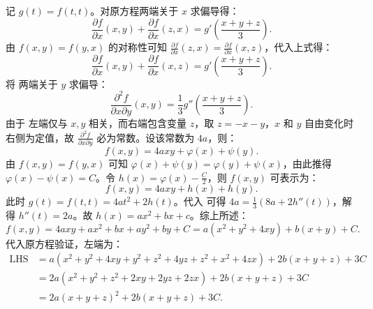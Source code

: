 \begin{solution}

    记 $g(t) = f(t,t)$。对原方程两端关于 $x$ 求偏导得：
    \begin{equation}
        \frac{\partial f}{\partial x}(x,y) + \frac{\partial f}{\partial x}(z,x) = g'\left( \frac{x+y+z}{3} \right).
    \end{equation}
    由 $f(x,y) = f(y,x)$ 的对称性可知 $\frac{\partial f}{\partial x}(z,x) = \frac{\partial f}{\partial x}(x,z)$，代入上式得：
    \begin{equation}
        \frac{\partial f}{\partial x}(x,y) + \frac{\partial f}{\partial x}(x,z) = g'\left( \frac{x+y+z}{3} \right). \label{eq:partial-x-1}
    \end{equation}
    将  两端关于 $y$ 求偏导：
    \begin{equation}
        \frac{\partial^2 f}{\partial x \partial y}(x,y) = \frac{1}{3} g''\left( \frac{x+y+z}{3} \right). \label{eq:second-partial-1}
    \end{equation}
    由于  左端仅与 $x,y$ 相关，而右端包含变量 $z$，取 $z = -x-y$，$x$ 和 $y$ 自由变化时右侧为定值，故 $\frac{\partial^2 f}{\partial x \partial y}$ 必为常数。设该常数为 $4a$，则：
    \begin{equation}
        f(x,y) = 4axy + \varphi(x) + \psi(y).
    \end{equation}
    由 $f(x,y) = f(y,x)$ 可知 $\varphi(x) + \psi(y) = \varphi(y) + \psi(x)$，由此推得 $\varphi(x) - \psi(x) = C$。令 $h(x) = \varphi(x) - \frac{C}{2}$，则 $f(x,y)$ 可表示为：
    \begin{equation}
        f(x,y) = 4axy + h(x) + h(y).
    \end{equation}
    此时 $g(t) = f(t,t) = 4at^2 + 2h(t)$。代入  可得 $4a = \frac{1}{3}(8a + 2h''(t))$，解得 $h''(t) = 2a$。故 $h(x) = ax^2 + bx + c$。综上所述：
    \begin{equation}
        f(x,y) = 4axy + ax^2 + bx + ay^2 + by + C = a(x^2 + y^2 + 4xy) + b(x+y) + C.
    \end{equation}
    代入原方程验证，左端为：
    \begin{equation}
        \begin{aligned}
            \text{LHS} & = a(x^2+y^2+4xy + y^2+z^2+4yz + z^2+x^2+4zx) + 2b(x+y+z) + 3C \\
                       & = 2a(x^2+y^2+z^2 + 2xy + 2yz + 2zx) + 2b(x+y+z) + 3C          \\
                       & = 2a(x+y+z)^2 + 2b(x+y+z) + 3C.

\end{aligned}
\end{equation}
\end{solution}
